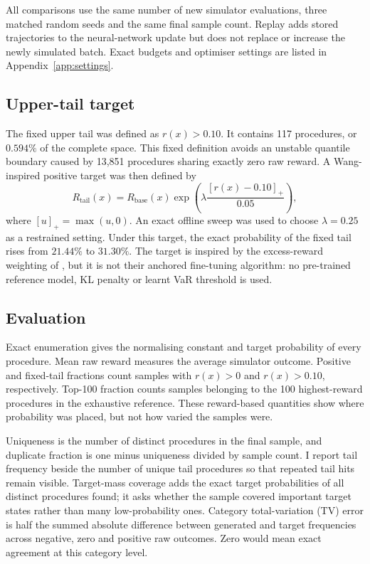 \documentclass{article}
\begin{document}
All comparisons use the same number of new simulator evaluations, three matched random seeds and the same final sample count. Replay adds stored trajectories to the neural-network update but does not replace or increase the newly simulated batch. Exact budgets and optimiser settings are listed in Appendix~\ref{app:settings}.

\subsection{Upper-tail target}

The fixed upper tail was defined as $r(x)>0.10$. It contains 117 procedures, or $0.594\%$ of the complete space. This fixed definition avoids an unstable quantile boundary caused by 13,851 procedures sharing exactly zero raw reward. A Wang-inspired positive target was then defined by
\begin{equation}
R_{\mathrm{tail}}(x)=R_{\mathrm{base}}(x)
\exp\!\left(\lambda\frac{[r(x)-0.10]_+}{0.05}\right),
\end{equation}
where $[u]_+=\max(u,0)$. An exact offline sweep was used to choose $\lambda=0.25$ as a restrained setting. Under this target, the exact probability of the fixed tail rises from $21.44\%$ to $31.30\%$. The target is inspired by the excess-reward weighting of \citet{wang2026tail}, but it is not their anchored fine-tuning algorithm: no pre-trained reference model, KL penalty or learnt VaR threshold is used.

\subsection{Evaluation}

Exact enumeration gives the normalising constant and target probability of every procedure. Mean raw reward measures the average simulator outcome. Positive and fixed-tail fractions count samples with $r(x)>0$ and $r(x)>0.10$, respectively. Top-100 fraction counts samples belonging to the 100 highest-reward procedures in the exhaustive reference. These reward-based quantities show where probability was placed, but not how varied the samples were.

Uniqueness is the number of distinct procedures in the final sample, and duplicate fraction is one minus uniqueness divided by sample count. I report tail frequency beside the number of unique tail procedures so that repeated tail hits remain visible. Target-mass coverage adds the exact target probabilities of all distinct procedures found; it asks whether the sample covered important target states rather than many low-probability ones. Category total-variation (TV) error is half the summed absolute difference between generated and target frequencies across negative, zero and positive raw outcomes. Zero would mean exact agreement at this category level.
\end{document}
